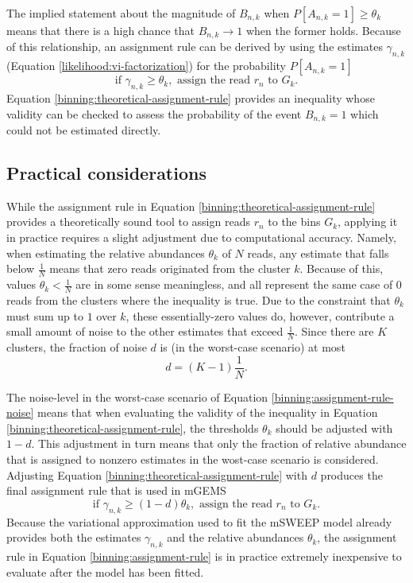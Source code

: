 \documentclass[officiallayout]{tktla}
\begin{document}
The implied statement about the magnitude of $B_{n, k}$ when
$P\left[A_{n, k} = 1\right] \geq \theta_{k}$ means that there is a
high chance that $B_{n, k} \rightarrow 1$ when the former
holds. Because of this relationship, an assignment rule can be derived
by using the estimates $\gamma_{n, k}$ (Equation
\eqref{likelihood:vi-factorization}) for the probability $P\left[A_{n,
    k} = 1\right]$
\begin{equation}
  \label{binning:theoretical-assignment-rule}
  \text{if } \gamma_{n, k} \geq \theta_{k}, \text{ assign the read } r_{n} \text{ to } G_{k}.
\end{equation}
Equation \eqref{binning:theoretical-assignment-rule} provides an
inequality whose validity can be checked to assess the probability of
the event $B_{n, k} = 1$ which could not be estimated directly.

\subsection{Practical considerations}

While the assignment rule in Equation
\eqref{binning:theoretical-assignment-rule} provides a theoretically
sound tool to assign reads $r_{n}$ to the bins $G_{k}$, applying it in
practice requires a slight adjustment due to computational
accuracy. Namely, when estimating the relative abundances $\theta_{k}$
of $N$ reads, any estimate that falls below $\frac{1}{N}$ means that
zero reads originated from the cluster $k$. Because of this, values
$\theta_{k} < \frac{1}{N}$ are in some sense meaningless, and all
represent the same case of 0 reads from the clusters where the
inequality is true. Due to the constraint that $\theta_{k}$ must sum
up to $1$ over $k$, these essentially-zero values do, however,
contribute a small amount of noise to the other estimates that exceed
$\frac{1}{N}$. Since there are $K$ clusters, the fraction of noise $d$
is (in the worst-case scenario) at most
\begin{equation}
  \label{binning:assignment-rule-noise}
  d = (K - 1)\frac{1}{N}.
\end{equation}

The noise-level in the worst-case scenario of Equation
\eqref{binning:assignment-rule-noise} means that when evaluating the
validity of the inequality in Equation
\eqref{binning:theoretical-assignment-rule}, the thresholds $\theta_k$
should be adjusted with $1 - d$. This adjustment in turn means that
only the fraction of relative abundance that is assigned to nonzero
estimates in the wost-case scenario is considered. Adjusting Equation
\eqref{binning:theoretical-assignment-rule} with $d$ produces the final
assignment rule that is used in mGEMS
\begin{equation}
  \label{binning:assignment-rule}
  \text{if } \gamma_{n, k} \geq (1 - d)\theta_{k}, \text{ assign the read } r_{n} \text{ to } G_{k}.
\end{equation}
Because the variational approximation used to fit the mSWEEP model
already provides both the estimates $\gamma_{n, k}$ and the relative
abundances $\theta_{k}$, the assignment rule in Equation
\eqref{binning:assignment-rule} is in practice extremely inexpensive to
evaluate after the model has been fitted.
\end{document}
